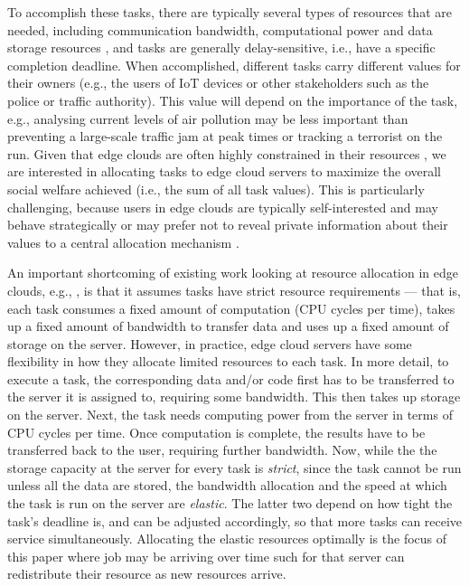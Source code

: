 \documentclass[sotoncolour]{extra/uosproject}     %
\begin{document}
To accomplish these tasks, there are typically several types of resources that are needed, including communication bandwidth, computational power and data storage resources \cite{vaji_infocom}, and tasks are generally delay-sensitive, i.e., have a specific completion deadline. When accomplished, different tasks carry different values for their owners (e.g., the users of IoT devices or other stakeholders such as the police or traffic authority). This value will depend on the importance of the task, e.g., analysing current levels of air pollution may be less important than preventing a large-scale traffic jam at peak times or tracking a terrorist on the run. Given that edge clouds are often highly constrained in their resources \cite{edge_limitations}, we are interested in allocating tasks to edge cloud servers to maximize the overall social welfare achieved (i.e., the sum of all task values). This is particularly challenging, because users in edge clouds are typically self-interested and may behave strategically \cite{Bi2019} or may prefer not to reveal private information about their values to a central allocation mechanism \cite{Pai2013}.

An important shortcoming of existing work looking at resource allocation in edge clouds, e.g., \cite{vaji_infocom,Bi2019}, is that it assumes tasks have strict resource requirements --- that is, each task consumes a fixed amount of computation (CPU cycles per time), takes up a fixed amount of bandwidth to transfer data and uses up a fixed amount of storage on the server. However, in practice, edge cloud servers have some flexibility in how they allocate limited resources to each task. In more detail, to execute a task, the corresponding data and/or code first has to be transferred to the server it is assigned to, requiring some bandwidth. This then takes up storage on the server. Next, the task needs computing power from the server in terms of CPU cycles per time. Once computation is complete, the results have to be transferred back to the user, requiring further bandwidth. Now, while the the storage capacity at the server for every task is \emph{strict}, since the task cannot be run unless all the data are stored, the bandwidth allocation and the speed at which the task is run on the server are \emph{elastic}. The latter two depend on how tight the task's deadline is, and can be adjusted  accordingly, so that more tasks can receive service simultaneously. Allocating the elastic resources optimally is the focus of this paper where job may be arriving over time such for that server can redistribute their resource as new resources arrive.
\end{document}
